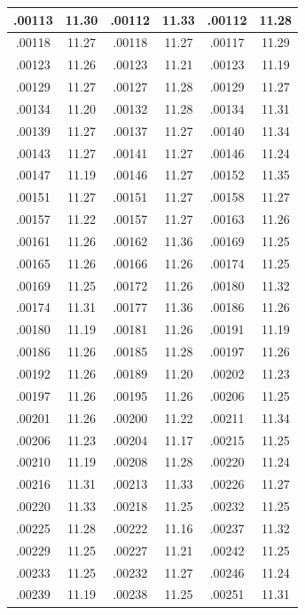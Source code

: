 \documentclass[10pt,twoside]{report}
\begin{document}
\begin{appendices}
\begin{longtable}{|c|c||c|c||c|c|}
.00113 & 11.30 & .00112 & 11.33 & .00112 & 11.28\\\hline
.00118 & 11.27 & .00118 & 11.27 & .00117 & 11.29\\\hline
.00123 & 11.26 & .00123 & 11.21 & .00123 & 11.19\\\hline
.00129 & 11.27 & .00127 & 11.28 & .00129 & 11.27\\\hline
.00134 & 11.20 & .00132 & 11.28 & .00134 & 11.31\\\hline
.00139 & 11.27 & .00137 & 11.27 & .00140 & 11.34\\\hline
.00143 & 11.27 & .00141 & 11.27 & .00146 & 11.24\\\hline
.00147 & 11.19 & .00146 & 11.27 & .00152 & 11.35\\\hline
.00151 & 11.27 & .00151 & 11.27 & .00158 & 11.27\\\hline
.00157 & 11.22 & .00157 & 11.27 & .00163 & 11.26\\\hline
.00161 & 11.26 & .00162 & 11.36 & .00169 & 11.25\\\hline
.00165 & 11.26 & .00166 & 11.26 & .00174 & 11.25\\\hline
.00169 & 11.25 & .00172 & 11.26 & .00180 & 11.32\\\hline
.00174 & 11.31 & .00177 & 11.36 & .00186 & 11.26\\\hline
.00180 & 11.19 & .00181 & 11.26 & .00191 & 11.19\\\hline
.00186 & 11.26 & .00185 & 11.28 & .00197 & 11.26\\\hline
.00192 & 11.26 & .00189 & 11.20 & .00202 & 11.23\\\hline
.00197 & 11.26 & .00195 & 11.26 & .00206 & 11.25\\\hline
.00201 & 11.26 & .00200 & 11.22 & .00211 & 11.34\\\hline
.00206 & 11.23 & .00204 & 11.17 & .00215 & 11.25\\\hline
.00210 & 11.19 & .00208 & 11.28 & .00220 & 11.24\\\hline
.00216 & 11.31 & .00213 & 11.33 & .00226 & 11.27\\\hline
.00220 & 11.33 & .00218 & 11.25 & .00232 & 11.25\\\hline
.00225 & 11.28 & .00222 & 11.16 & .00237 & 11.32\\\hline
.00229 & 11.25 & .00227 & 11.21 & .00242 & 11.25\\\hline
.00233 & 11.25 & .00232 & 11.27 & .00246 & 11.24\\\hline
.00239 & 11.19 & .00238 & 11.25 & .00251 & 11.31\\\hline

\end{longtable}
\end{appendices}
\end{document}
